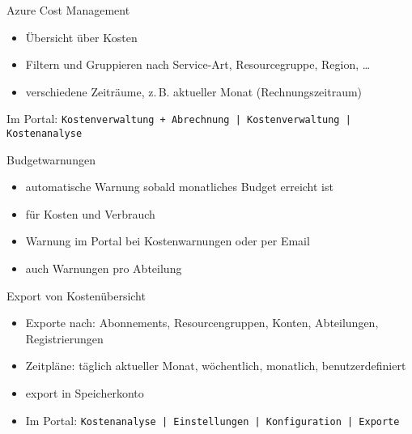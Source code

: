 
\begin{flashcard}[Definition]{Azure Cost Management}

    \begin{itemize}
        \item Übersicht über Kosten
        \item Filtern und Gruppieren nach Service-Art, Resourcegruppe, Region, \ldots
        \item verschiedene Zeiträume, z.\,B. aktueller Monat (Rechnungszeitraum)
    \end{itemize}
    Im Portal: \texttt{Kostenverwaltung + Abrechnung | Kostenverwaltung | Kostenanalyse}
\end{flashcard}

\begin{flashcard}[Definition]{Budgetwarnungen}
    \begin{itemize}
        \item automatische Warnung sobald monatliches Budget erreicht ist
        \item für Kosten und Verbrauch
        \item Warnung im Portal bei Kostenwarnungen oder per Email
        \item auch Warnungen pro Abteilung
    \end{itemize}
\end{flashcard}


\begin{flashcard}[Definition]{Export von Kostenübersicht}
    \begin{itemize}
        \item Exporte nach: Abonnements, Resourcengruppen, Konten, Abteilungen, Registrierungen
        \item Zeitpläne: täglich aktueller Monat, wöchentlich, monatlich, benutzerdefiniert
        \item export in Speicherkonto
        \item Im Portal:\newline
            \texttt{Kostenanalyse | Einstellungen | Konfiguration | Exporte }
    \end{itemize}
\end{flashcard}


